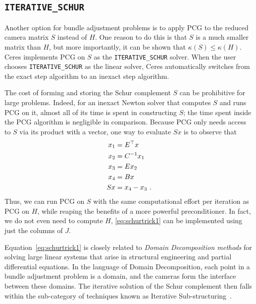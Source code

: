 

\subsection{\texttt{ITERATIVE\_SCHUR}}
Another option for bundle adjustment problems is to apply PCG to the reduced camera matrix $S$ instead of $H$. One reason to do this is that $S$ is a much smaller matrix than $H$, but more importantly, it can be shown that $\kappa(S)\leq \kappa(H)$.  Ceres implements PCG on $S$ as the \texttt{ITERATIVE\_SCHUR} solver. When the user chooses \texttt{ITERATIVE\_SCHUR} as the linear solver, Ceres automatically switches from the exact step algorithm to an inexact step algorithm.

The cost of forming and storing the Schur complement $S$ can be prohibitive for large problems. Indeed, for an inexact Newton solver that computes $S$ and runs PCG on it, almost all of its time is spent in constructing $S$; the time spent inside the PCG algorithm is negligible in comparison. Because  PCG only needs access to $S$ via its product with a vector, one way to evaluate $Sx$ is to observe that
\begin{align}
  x_1 &= E^\top x \notag \\
  x_2 &= C^{-1} x_1 \notag\\
  x_3 &= Ex_2 \notag\\
  x_4 &= Bx \notag\\
  Sx &= x_4 - x_3\ .\label{eq:schurtrick1}
\end{align}
Thus, we can run PCG on $S$ with the same computational effort per iteration as PCG on $H$, while reaping the benefits of a more powerful preconditioner. In fact, we do not even need to compute $H$, \eqref{eq:schurtrick1} can be implemented using just the columns of $J$.

Equation~\eqref{eq:schurtrick1} is closely related to {\em Domain Decomposition methods} for solving large linear systems that arise in structural engineering and partial differential equations. In the language of Domain Decomposition, each point in a bundle adjustment problem is a domain, and the cameras form the interface between these domains. The iterative solution of the Schur complement then falls within the sub-category of techniques known as Iterative Sub-structuring~\cite{saad2003iterative,mathew2008domain}.

